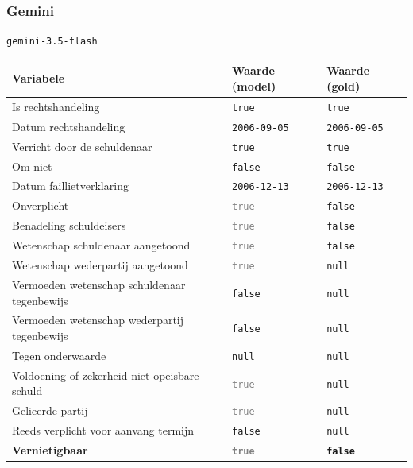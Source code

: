 \documentclass[
  dutch,
  a4paper,
]{article}
\begin{document}
\newpage


\subsubsection{Gemini}\label{gemini-24}

\texttt{gemini-3.5-flash}

\begin{center}
\small
\begin{tabular}{@{}p{7.4cm}p{2.6cm}p{2.6cm}@{}}
\toprule
Variabele & Waarde (model) & Waarde (gold) \\
\midrule
Is rechtshandeling & \texttt{true} & \texttt{true} \\
Datum rechtshandeling & \texttt{2006-09-05} & \texttt{2006-09-05} \\
Verricht door de schuldenaar & \texttt{true} & \texttt{true} \\
Om niet & \texttt{false} & \texttt{false} \\
Datum faillietverklaring & \texttt{2006-12-13} & \texttt{2006-12-13} \\
Onverplicht & \textcolor{gray}{\texttt{true}} & \texttt{false} \\
Benadeling schuldeisers & \textcolor{gray}{\texttt{true}} & \texttt{false} \\
Wetenschap schuldenaar aangetoond & \textcolor{gray}{\texttt{true}} & \texttt{false} \\
Wetenschap wederpartij aangetoond & \textcolor{gray}{\texttt{true}} & \texttt{null} \\
Vermoeden wetenschap schuldenaar tegenbewijs & \texttt{false} & \texttt{null} \\
Vermoeden wetenschap wederpartij tegenbewijs & \texttt{false} & \texttt{null} \\
Tegen onderwaarde & \texttt{null} & \texttt{null} \\
Voldoening of zekerheid niet opeisbare schuld & \textcolor{gray}{\texttt{true}} & \texttt{null} \\
Gelieerde partij & \textcolor{gray}{\texttt{true}} & \texttt{null} \\
Reeds verplicht voor aanvang termijn & \texttt{false} & \texttt{null} \\
\textbf{Vernietigbaar} & \textbf{\textcolor{gray}{\texttt{true}}} & \textbf{\texttt{false}} \\
\bottomrule
\end{tabular}
\end{center}
\end{document}
